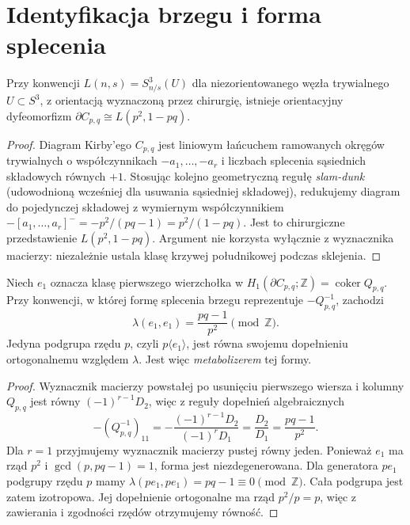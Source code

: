 \section{Identyfikacja brzegu i forma splecenia}
\label{sec:tg-general-boundary}

\begin{twierdzenie}
\label{thm:tg-general-lens}
Przy konwencji $L(n,s)=S^3_{n/s}(U)$ dla
niezorientowanego węzła trywialnego $U\subset S^3$,
z orientacją wyznaczoną przez chirurgię, istnieje
orientacyjny dyfeomorfizm
$\partial C_{p,q}\cong L(p^2,1-pq)$.
\end{twierdzenie}

\begin{proof}
Diagram Kirby'ego $C_{p,q}$ jest liniowym łańcuchem
ramowanych okręgów trywialnych o współczynnikach
$-a_1,\ldots,-a_r$ i liczbach splecenia sąsiednich
składowych równych $+1$.
Stosując kolejno geometryczną regułę \emph{slam-dunk}
(udowodnioną wcześniej dla usuwania sąsiedniej składowej),
redukujemy diagram do pojedynczej składowej z wymiernym
współczynnikiem
$-[a_1,\ldots,a_r]^-= -p^2/(pq-1)=p^2/(1-pq)$.
Jest to chirurgiczne przedstawienie $L(p^2,1-pq)$.
Argument nie korzysta wyłącznie z wyznacznika macierzy:
niezależnie ustala klasę krzywej południkowej podczas sklejenia.
\end{proof}

\begin{stwierdzenie}
\label{prop:tg-general-linking}
Niech $e_1$ oznacza klasę pierwszego wierzchołka w
$H_1(\partial C_{p,q};\mathbb Z)=\operatorname{coker}Q_{p,q}$.
Przy konwencji, w której formę splecenia brzegu reprezentuje
$-Q_{p,q}^{-1}$, zachodzi
\[
\lambda(e_1,e_1)=\frac{pq-1}{p^2}\pmod{\mathbb Z}.
\]
Jedyna podgrupa rzędu $p$, czyli $p\langle e_1\rangle$,
jest równa swojemu dopełnieniu ortogonalnemu względem
$\lambda$. Jest więc \emph{metabolizerem} tej formy.
\end{stwierdzenie}

\begin{proof}
Wyznacznik macierzy powstałej po usunięciu pierwszego
wiersza i kolumny $Q_{p,q}$ jest równy
$(-1)^{r-1}D_2$, więc z reguły dopełnień algebraicznych
\[
-(Q_{p,q}^{-1})_{11}=
-\frac{(-1)^{r-1}D_2}{(-1)^rD_1}
=\frac{D_2}{D_1}=
\frac{pq-1}{p^2}.
\]
Dla $r=1$ przyjmujemy wyznacznik macierzy pustej równy jeden.
Ponieważ $e_1$ ma rząd $p^2$ i $\gcd(p,pq-1)=1$,
forma jest niezdegenerowana. Dla generatora $pe_1$ podgrupy
rzędu $p$ mamy
$\lambda(pe_1,pe_1)=pq-1\equiv0\pmod{\mathbb Z}$.
Cała podgrupa jest zatem izotropowa.
Jej dopełnienie ortogonalne ma rząd $p^2/p=p$,
więc z zawierania i zgodności rzędów otrzymujemy równość.
\end{proof}

